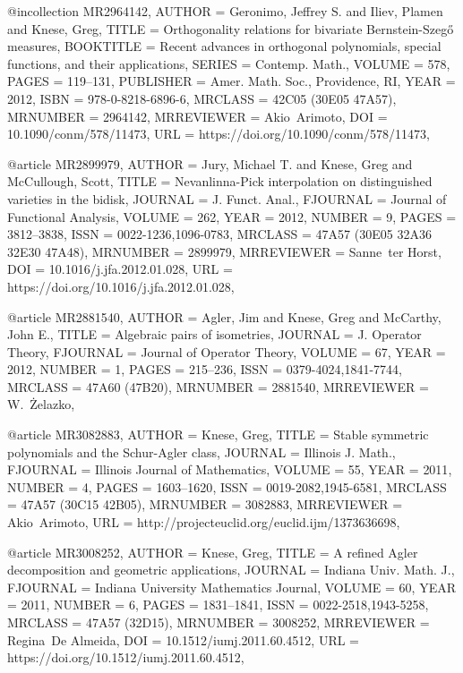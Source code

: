 @incollection {MR2964142,
    AUTHOR = {Geronimo, Jeffrey S. and Iliev, Plamen and Knese, Greg},
     TITLE = {Orthogonality relations for bivariate {B}ernstein-{S}zeg\H o{}
              measures},
 BOOKTITLE = {Recent advances in orthogonal polynomials, special functions,
              and their applications},
    SERIES = {Contemp. Math.},
    VOLUME = {578},
     PAGES = {119--131},
 PUBLISHER = {Amer. Math. Soc., Providence, RI},
      YEAR = {2012},
      ISBN = {978-0-8218-6896-6},
   MRCLASS = {42C05 (30E05 47A57)},
  MRNUMBER = {2964142},
MRREVIEWER = {Akio\ Arimoto},
       DOI = {10.1090/conm/578/11473},
       URL = {https://doi.org/10.1090/conm/578/11473},
}

@article {MR2899979,
    AUTHOR = {Jury, Michael T. and Knese, Greg and McCullough, Scott},
     TITLE = {Nevanlinna-{P}ick interpolation on distinguished varieties in
              the bidisk},
   JOURNAL = {J. Funct. Anal.},
  FJOURNAL = {Journal of Functional Analysis},
    VOLUME = {262},
      YEAR = {2012},
    NUMBER = {9},
     PAGES = {3812--3838},
      ISSN = {0022-1236,1096-0783},
   MRCLASS = {47A57 (30E05 32A36 32E30 47A48)},
  MRNUMBER = {2899979},
MRREVIEWER = {Sanne\ ter Horst},
       DOI = {10.1016/j.jfa.2012.01.028},
       URL = {https://doi.org/10.1016/j.jfa.2012.01.028},
}

@article {MR2881540,
    AUTHOR = {Agler, Jim and Knese, Greg and McCarthy, John E.},
     TITLE = {Algebraic pairs of isometries},
   JOURNAL = {J. Operator Theory},
  FJOURNAL = {Journal of Operator Theory},
    VOLUME = {67},
      YEAR = {2012},
    NUMBER = {1},
     PAGES = {215--236},
      ISSN = {0379-4024,1841-7744},
   MRCLASS = {47A60 (47B20)},
  MRNUMBER = {2881540},
MRREVIEWER = {W.\ \.Zelazko},
}

@article {MR3082883,
    AUTHOR = {Knese, Greg},
     TITLE = {Stable symmetric polynomials and the {S}chur-{A}gler class},
   JOURNAL = {Illinois J. Math.},
  FJOURNAL = {Illinois Journal of Mathematics},
    VOLUME = {55},
      YEAR = {2011},
    NUMBER = {4},
     PAGES = {1603--1620},
      ISSN = {0019-2082,1945-6581},
   MRCLASS = {47A57 (30C15 42B05)},
  MRNUMBER = {3082883},
MRREVIEWER = {Akio\ Arimoto},
       URL = {http://projecteuclid.org/euclid.ijm/1373636698},
}

@article {MR3008252,
    AUTHOR = {Knese, Greg},
     TITLE = {A refined {A}gler decomposition and geometric applications},
   JOURNAL = {Indiana Univ. Math. J.},
  FJOURNAL = {Indiana University Mathematics Journal},
    VOLUME = {60},
      YEAR = {2011},
    NUMBER = {6},
     PAGES = {1831--1841},
      ISSN = {0022-2518,1943-5258},
   MRCLASS = {47A57 (32D15)},
  MRNUMBER = {3008252},
MRREVIEWER = {Regina\ De Almeida},
       DOI = {10.1512/iumj.2011.60.4512},
       URL = {https://doi.org/10.1512/iumj.2011.60.4512},
}

